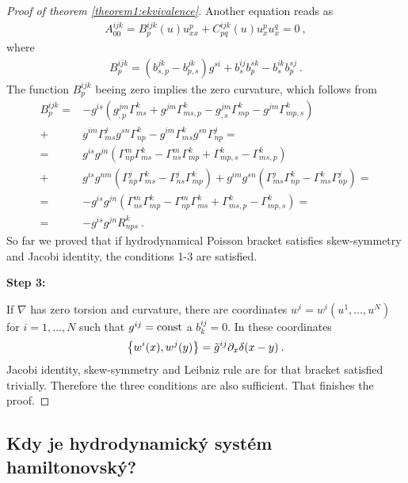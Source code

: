 \begin{proof}[Proof of theorem \ref{theorem1:ekvivalence}]
    Another equation reads as
    \begin{align}
        A_{00}^{ijk} = B^{ijk}_p(u) u^p_{xx} + C^{ijk}_{pq}(u) u^p_x u^q_x = 0 \:,
    \end{align}
    where
    \begin{align}
        B^{ijk}_p 
        = (b^{jk}_{s,p} - b^{jk}_{p,s}) g^{si} + b_s^{ij} b_p^{sk} - b_s^{ik} b_p^{sj} \:.
    \end{align}
    The function $B^{ijk}_p$ beeing zero implies the zero curvature, which follows from
    \begin{align}
        B^{ijk}_p  
        =& -g^{is} \left( g^{jm}_{,p} \Gamma^k_{ms} + g^{jm} \Gamma^k_{ms,p} - g^{jm}_{,s} \Gamma^k_{mp} - g^{jm} \Gamma^k_{mp,s} \right) 
        \\ +& g^{im} \Gamma^j_{ms} g^{sn} \Gamma^{k}_{np} - g^{im} \Gamma^k_{ms} g^{sn} \Gamma^j_{np}
        = \\ =& g^{is} g^{jn} \left( \Gamma^m_{np} \Gamma^k_{ms} - \Gamma^{m}_{ns} \Gamma^k_{mp} + \Gamma^{k}_{mp,s} -  \Gamma^{k}_{ms,p} \right) 
        \\ +& g^{is} g^{nm} \left( \Gamma^j_{np} \Gamma^{k}_{ms} - \Gamma^j_{ns} \Gamma^k_{mp} \right) + g^{im} g^{sn} \left( \Gamma^j_{ms} \Gamma^k_{np} - \Gamma^k_{ms} \Gamma^j_{np} \right)
        = \\ =& -g^{is} g^{jn} \left( \Gamma^{m}_{ns} \Gamma^k_{mp}  - \Gamma^m_{np} \Gamma^k_{ms} + \Gamma^{k}_{ms,p} - \Gamma^{k}_{mp,s} \right)
        = \\ =& -g^{is} g^{jn} R^k_{nps} \:.
    \end{align}
    So far we proved that if hydrodynamical Poisson bracket satisfies skew-symmetry and Jacobi identity, the conditions 1-3 are satisfied.

    \textbf{Step 3:}

    If $\nabla$ has zero torsion and curvature, there are coordinates $w^i=w^i(u^1,\dots,u^N)$ for $i=1,\dots,N$ such that $g^{ij} = \mathrm{const}$ a $b^{ij}_k = 0$. In these coordinates
    \begin{align}
        \left \lbrace w^i(x),w^j(y) \right \rbrace = \tilde{g}^{ij} \partial_x \delta(x-y) \:.
    \end{align}
    Jacobi identity, skew-symmetry and Leibniz rule are for that bracket satisfied trivially. Therefore the three conditions are also sufficient. That finishes the proof.
\end{proof}

\subsection{Kdy je hydrodynamický systém hamiltonovský?}

